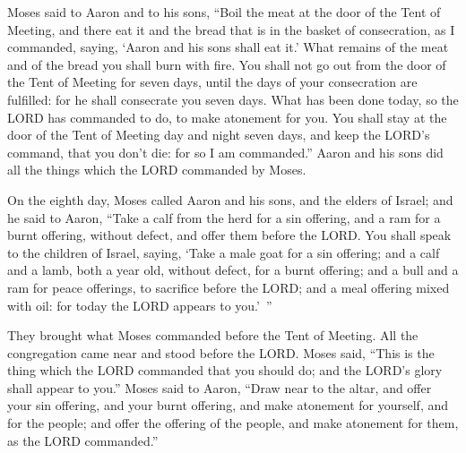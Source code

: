 \myverse{}Moses said to Aaron and to his sons, “Boil the meat at the door
of the Tent of Meeting, and there eat it and the bread that is in the basket of consecration, as I commanded,
saying, ‘Aaron and his sons shall eat it.’
\myverse{}What remains of the meat and of the bread you shall burn with fire.
\myverse{}You shall not go out from the door of the Tent of Meeting for seven days,
until the days of your consecration are fulfilled: for he shall consecrate you seven days.
\myverse{}What has been done today, so the LORD has commanded to do, to make atonement
for you.
\myverse{}You shall stay at the door of the Tent of Meeting day and night seven days,
and keep the LORD’s command, that you don’t die: for so I am commanded.”
\myverse{}Aaron and his sons did all the things which the LORD commanded by Moses.


\mychapter{} \myverse*{}On the eighth day, Moses called Aaron and his sons, and the elders
of Israel;
\myverse{}and he said to Aaron, “Take a calf from the herd for a sin offering, and a ram
for a burnt offering, without defect, and offer them before the LORD.
\myverse{}You shall speak to the children of Israel, saying, ‘Take a male goat for a sin
offering; and a calf and a lamb, both a year old, without defect, for a burnt offering;
\myverse{}and a bull and a ram for peace offerings, to sacrifice before the LORD; and
a meal offering mixed with oil: for today the LORD appears to you.’ ”


\myverse{}They brought what Moses commanded before the Tent of Meeting. All
the congregation came near and stood before the LORD.
\myverse{}Moses said, “This is the thing which the LORD commanded that you should do;
and the LORD’s glory shall appear to you.”
\myverse{}Moses said to Aaron, “Draw near to the altar, and offer your sin offering, and
your burnt offering, and make atonement for yourself, and for the people; and offer the offering of the
people, and make atonement for them, as the LORD commanded.”


